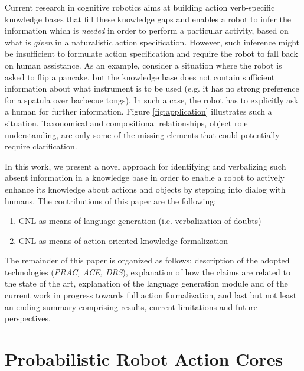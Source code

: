 \documentclass[oribibl]{llncs}
\begin{document}
Current research in cognitive robotics aims at building action 
verb-specific knowledge bases that fill these knowledge gaps and 
enables a robot to infer the information which is \textit{needed} in 
order to perform a particular activity, based on what is \textit 
{given} in a naturalistic action specification. However, such 
inference might be insufficient to formulate action specification and require 
the robot to fall back on human assistance. As an example, consider a situation where 
the robot is asked to flip a pancake, but the knowledge base does 
not contain sufficient information about what instrument is to be used 
(e.g. it has no strong preference for a spatula over barbecue 
tongs). In such a case, the robot has to explicitly ask a human for 
further information. Figure \ref{fig:application} illustrates such a 
situation. Taxonomical and compositional relationships, object role 
understanding, are only some of the missing elements that could 
potentially require clarification. 

In this work, we present a novel approach for identifying and 
verbalizing such absent information in a knowledge base in order to enable
a robot to actively enhance its knowledge about actions and objects
by stepping into dialog with humans.
The contributions of this paper are the following:
\begin{enumerate}
    \item CNL as means of language generation (i.e. verbalization of doubts)
    \item CNL as means of action-oriented knowledge formalization
\end{enumerate}
The remainder of this paper is organized as follows: 
description of the adopted technologies (\textit{PRAC, ACE, DRS}), explanation of how the claims are related to the state of the art, explanation of the language generation module and of the current work in progress towards full action formalization, and last but not least an ending summary comprising results, current limitations and future perspectives. 

\section{Probabilistic Robot Action Cores}
\end{document}
